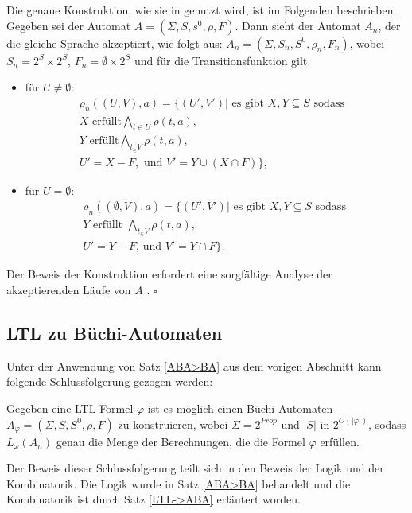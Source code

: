 Die genaue Konstruktion, wie sie in \cite{vardi+96} genutzt wird, ist im Folgenden beschrieben. Gegeben sei der Automat $A=(\Sigma,S, s^0, \rho, F)$. Dann sieht der Automat $A_n$, der die gleiche Sprache akzeptiert, wie folgt aus: $A_n=(\Sigma,S_n,S^0,\rho_n,F_n)$, wobei $S_n=2^S\times2^S$, $F_n={\emptyset}\times2^S$ und für die Transitionsfunktion gilt \begin{itemize}
\item für $U\neq\emptyset$:
\begin{align*}
\rho_n((U,V),a)=\{(U',V')| \text{ es gibt } X,Y\subseteq S\text{ sodass}&\\
X \text{ erfüllt} \bigwedge_{t \in U}\rho(t,a),\\
Y \text{ erfüllt} \bigwedge_{t_\in V}\rho(t,a),\\
U'=X-F, \text{ und } V'=Y\cup(X\cap F)\},
\end{align*}
\item für $U=\emptyset$:
\begin{align*}
\rho_n((\emptyset,V),a)=\{(U',V')|\text{ es gibt } X,Y\subseteq S \text{ sodass }\\
Y \text{ erfüllt } \bigwedge_{t_\in V}\rho(t,a),\\
U'=Y-F\text{, und } V'=Y\cap F\}.
\end{align*}
\end{itemize}
Der Beweis der Konstruktion erfordert eine sorgfältige Analyse der akzeptierenden Läufe von $A$ \cite{vardi+96}.
$\square$



\subsection{LTL zu Büchi-Automaten}

Unter der Anwendung von Satz \ref{ABA>BA} aus dem vorigen Abschnitt kann folgende Schlussfolgerung gezogen werden:

\begin{korol}\cite{vardi+96,vardi+94}
Gegeben eine LTL Formel $\varphi$ ist es möglich einen Büchi-Automaten $A_{\varphi}=(\Sigma,S, S^0,\rho,F)$ zu konstruieren, wobei $\Sigma=2^{Prop}$ und $|S|$ in $2^{O(|\varphi|)}$, sodass $L_{\omega}(A_n)$ genau die Menge der Berechnungen, die die Formel $\varphi$ erfüllen.
\end{korol}

Der Beweis dieser Schlussfolgerung teilt sich in den Beweis der Logik und der Kombinatorik. Die Logik wurde in Satz \ref{ABA>BA} behandelt und die Kombinatorik ist durch Satz \ref{LTL->ABA} erläutert worden.


